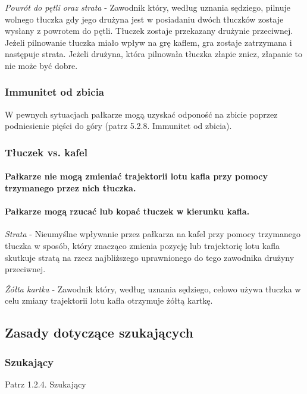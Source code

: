 \documentclass[12pt]{article}
\begin{document}
\emph{Powrót do pętli oraz strata} - Zawodnik który, według uznania
sędziego, pilnuje wolnego tłuczka gdy jego drużyna jest w posiadaniu
dwóch tłuczków zostaje wysłany z powrotem do pętli. Tłuczek zostaje
przekazany drużynie przeciwnej. Jeżeli pilnowanie tłuczka miało wpływ na
grę kaflem, gra zostaje zatrzymana i następuje strata. Jeżeli drużyna,
która pilnowała tłuczka złapie znicz, złapanie to nie może być dobre.

\subsubsection{Immunitet od zbicia}

W pewnych sytuacjach pałkarze mogą uzyskać odponość na zbicie poprzez
podniesienie pięści do góry (patrz 5.2.8. Immunitet od zbicia).

\subsubsection{Tłuczek vs. kafel}

\paragraph{Pałkarze nie mogą zmieniać trajektorii lotu kafla przy
	pomocy trzymanego przez nich tłuczka.}

\paragraph{Pałkarze mogą rzucać lub kopać tłuczek w kierunku
	kafla.}

\emph{Strata} - Nieumyślne wpływanie przez pałkarza na kafel przy pomocy
trzymanego tłuczka w sposób, który znacząco zmienia pozycję lub
trajektorię lotu kafla skutkuje stratą na rzecz najbliższego
uprawnionego do tego zawodnika drużyny przeciwnej.

\emph{Żółta kartka} - Zawodnik który, według uznania sędziego, celowo
używa tłuczka w celu zmiany trajektorii lotu kafla otrzymuje żółtą
kartkę.

\subsection{Zasady dotyczące szukających}

\subsubsection{Szukający}
Patrz 1.2.4. Szukający
\end{document}
